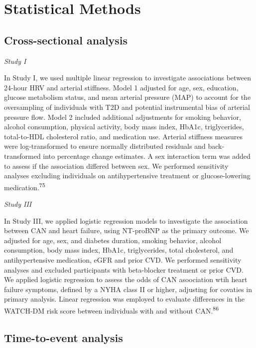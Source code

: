 \documentclass[
  letterpaper,
  headsepline=true,
  open=any]{scrbook}
\begin{document}
\hypertarget{statistical-methods}{%
\section{Statistical Methods}\label{statistical-methods}}

\hypertarget{cross-sectional-analysis}{%
\subsection{Cross-sectional analysis}\label{cross-sectional-analysis}}

\emph{Study I}

In Study I, we used multiple linear regression to investigate
associations between 24-hour HRV and arterial stiffness. Model 1
adjusted for age, sex, education, glucose metabolism status, and mean
arterial pressure (MAP) to account for the oversampling of individuals
with T2D and potential instrumental bias of arterial pressure flow.
Model 2 included additional adjustments for smoking behavior, alcohol
consumption, physical activity, body mass index, HbA1c, triglycerides,
total-to-HDL cholesterol ratio, and medication use. Arterial stiffness
measures were log-transformed to ensure normally distributed residuals
and back-transformed into percentage change estimates. A sex interaction
term was added to assess if the association differed between sex. We
performed sensitivity analyses excluding individuals on antihypertensive
treatment or glucose-lowering medication.\textsuperscript{75}

\emph{Study III}

In Study III, we applied logistic regression models to investigate the
association between CAN and heart failure, using NT-proBNP as the
primary outcome. We adjusted for age, sex, and diabetes duration,
smoking behavior, alcohol consumption, body mass index, HbA1c,
triglycerides, total cholesterol, and antihypertensive medication, eGFR
and prior CVD. We performed sensitivity analyses and excluded
participants with beta-blocker treatment or prior CVD. We applied
logistic regression to assess the odds of CAN asoociation wtih heart
failure symptoms, defined by a NYHA class II or higher, adjusting for
covaties in primary analysis. Linear regression was employed to evaluate
differences in the WATCH-DM risk score between individuals with and
without CAN.\textsuperscript{86}

\hypertarget{time-to-event-analysis}{%
\subsection{Time-to-event analysis}\label{time-to-event-analysis}}
\end{document}
